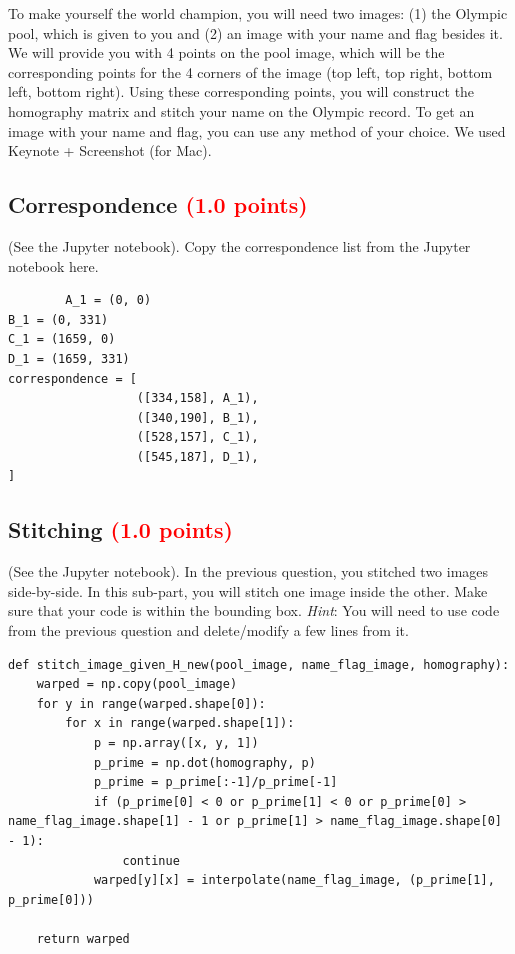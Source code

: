 \documentclass[answers]{exam}
\newcommand{\mypoints}[1]{\textcolor{red}{(#1 points)}}
\begin{document}
To make yourself the world champion, you will need two images: (1) the Olympic pool, which is given to you and (2) an image with your name and flag besides it. We will provide you with 4 points on the pool image, which will be the corresponding points for the 4 corners of the image (top left, top right, bottom left, bottom right). Using these corresponding points, you will construct the homography matrix and stitch your name on the Olympic record. To get an image with your name and flag, you can use any method of your choice. We used Keynote + Screenshot (for Mac). 

\subsection{Correspondence \mypoints{1.0}}
(See the Jupyter notebook).
Copy the correspondence list from the Jupyter notebook here.
\begin{solution}
    \begin{verbatim}
        A_1 = (0, 0)
B_1 = (0, 331)
C_1 = (1659, 0)
D_1 = (1659, 331)
correspondence = [
                  ([334,158], A_1),
                  ([340,190], B_1),
                  ([528,157], C_1),
                  ([545,187], D_1),
]
    \end{verbatim}
\end{solution}

\subsection{Stitching \mypoints{1.0}}
(See the Jupyter notebook).
In the previous question, you stitched two images side-by-side. In this sub-part, you will stitch one image inside the other. Make sure that your code is within the bounding box.
\textit{Hint}: You will need to use code from the previous question and delete/modify a few lines from it.
\begin{solution}
    \begin{verbatim}
def stitch_image_given_H_new(pool_image, name_flag_image, homography):
    warped = np.copy(pool_image)
    for y in range(warped.shape[0]):
        for x in range(warped.shape[1]):
            p = np.array([x, y, 1])
            p_prime = np.dot(homography, p)
            p_prime = p_prime[:-1]/p_prime[-1]
            if (p_prime[0] < 0 or p_prime[1] < 0 or p_prime[0] > name_flag_image.shape[1] - 1 or p_prime[1] > name_flag_image.shape[0] - 1):
                continue
            warped[y][x] = interpolate(name_flag_image, (p_prime[1], p_prime[0]))

    return warped
    \end{verbatim}
\end{solution}
\end{document}
